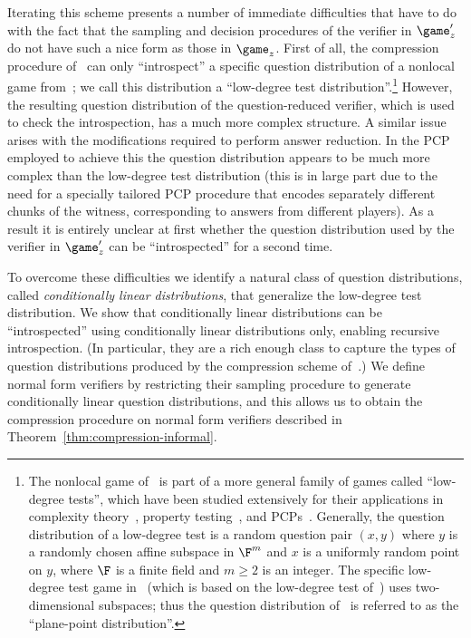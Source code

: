 	Iterating this scheme presents a number of immediate difficulties that have to do with the fact that the sampling and decision procedures of the verifier in $\game'_z$ do not have such a nice form as those in $\game_z$. First of all, the compression procedure of~\cite{NW19} can only ``introspect'' a specific question distribution of a nonlocal game from~\cite{natarajan2018two}; we call this distribution a ``low-degree test distribution''.\footnote{The nonlocal game of~\cite{natarajan2018two} is part of a more general family of games called ``low-degree tests'', which have been studied extensively for their applications in complexity theory~\cite{babai1991non}, property testing~\cite{rubinfeld1996robust}, and PCPs~\cite{arora1998probabilistic}. Generally, the question distribution of a low-degree test is a random question pair $(x,y)$ where $y$ is a randomly chosen affine subspace in $\F^m$ and $x$ is a uniformly random point on $y$, where $\F$ is a finite field and $m \geq 2$ is an integer. The specific low-degree test game in~\cite{natarajan2018two} (which is based on the low-degree test of~\cite{raz1997sub}) uses two-dimensional subspaces; thus the question distribution of~\cite{raz1997sub,natarajan2018two} is referred to as the ``plane-point distribution''.} However, the resulting question distribution of the question-reduced verifier, which is used to check the introspection, has a much more complex structure. A similar issue arises with the modifications required to perform answer reduction. In the PCP employed to achieve this the question distribution appears to be much more complex than the low-degree test distribution (this is in large part due to the need for a specially tailored PCP procedure that encodes separately different chunks of the witness, corresponding to answers from different players). As a result it is entirely unclear at first whether the question distribution used by the verifier in $\game'_z$ can be ``introspected'' for a second time. 
	
	To overcome these difficulties we identify a natural class of question distributions, called \emph{conditionally linear distributions}, that generalize the low-degree test distribution. We show that conditionally linear distributions can be ``introspected'' using conditionally linear distributions only, enabling recursive introspection. (In particular, they are a rich enough class to capture the types of question distributions produced by the compression scheme of~\cite{NW19}.) We define normal form verifiers by restricting their sampling procedure to generate conditionally linear question distributions, and this allows us to obtain the compression procedure on normal form verifiers described in Theorem~\ref{thm:compression-informal}. 
	
